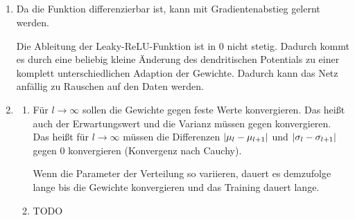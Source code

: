 \documentclass[DIN, pagenumber=false, fontsize=11pt, parskip=half]{scrartcl}
\DeclarePairedDelimiter\abs{\lvert}{\rvert}%
\begin{document}
    \subsection{}
    \begin{enumerate}[label=\alph*)]
        \item Da die Funktion differenzierbar ist, kann mit Gradientenabstieg gelernt werden.

            Die Ableitung der Leaky-ReLU-Funktion ist in $0$ nicht stetig. Dadurch kommt es durch eine beliebig kleine Änderung des dendritischen Potentials zu
            einer komplett unterschiedlichen Adaption der Gewichte. Dadurch kann das Netz anfällig zu Rauschen auf den Daten werden.
        \item 
            \begin{enumerate}[label=\roman*.]
                \item Für $l \to \infty$ sollen die Gewichte gegen feste Werte konvergieren. Das heißt auch der Erwartungswert und die Varianz müssen gegen konvergieren. Das heißt für $l \to \infty$ müssen die Differenzen $\abs{\mu_l - \mu_{l+1}}$ und $\abs{\sigma_l - \sigma_{l+1}}$ gegen $0$ konvergieren (Konvergenz nach Cauchy).

                    Wenn die Parameter der Verteilung so variieren, dauert es demzufolge lange bis die Gewichte konvergieren und das Training dauert lange.
                \item TODO
            \end{enumerate}
    \end{enumerate}
\end{document}

